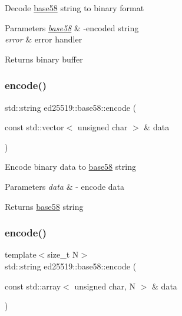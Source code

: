 Decode \mbox{\hyperlink{namespaceed25519_1_1base58}{base58}} string to binary format 
\begin{DoxyParams}{Parameters}
{\em \mbox{\hyperlink{namespaceed25519_1_1base58}{base58}}} & -\/encoded string \\
\hline
{\em error} & error handler \\
\hline
\end{DoxyParams}
\begin{DoxyReturn}{Returns}
binary buffer 
\end{DoxyReturn}
\mbox{\label{namespaceed25519_1_1base58_a857764be1561c5e59bab056d771f22a1}} 
\subsubsection{\texorpdfstring{encode()}{encode()}\hspace{0.1cm}{\footnotesize\ttfamily [1/2]}}
{\footnotesize\ttfamily std\+::string ed25519\+::base58\+::encode (\begin{DoxyParamCaption}\item[{const std\+::vector$<$ unsigned char $>$ \&}]{data }\end{DoxyParamCaption})}

Encode binary data to \mbox{\hyperlink{namespaceed25519_1_1base58}{base58}} string 
\begin{DoxyParams}{Parameters}
{\em data} & -\/ encode data \\
\hline
\end{DoxyParams}
\begin{DoxyReturn}{Returns}
\mbox{\hyperlink{namespaceed25519_1_1base58}{base58}} string 
\end{DoxyReturn}
\mbox{\label{namespaceed25519_1_1base58_a9e1eded8fc634072114771f77046693a}} 
\subsubsection{\texorpdfstring{encode()}{encode()}\hspace{0.1cm}{\footnotesize\ttfamily [2/2]}}
{\footnotesize\ttfamily template$<$size\+\_\+t N$>$ \\
std\+::string ed25519\+::base58\+::encode (\begin{DoxyParamCaption}\item[{const std\+::array$<$ unsigned char, N $>$ \&}]{data }\end{DoxyParamCaption})}

